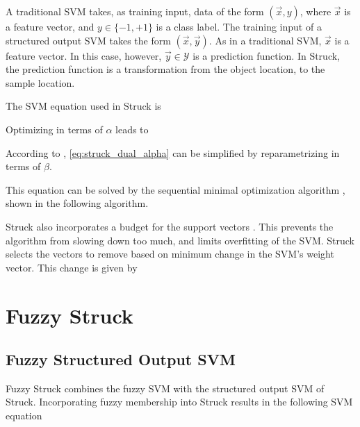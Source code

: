 \documentclass{IEEEtran}
\begin{document}
A traditional SVM takes, as training input, data of the form \((\vec{x}, y)\), where
\(\vec{x}\) is a feature vector, and \(y \in \{-1, +1\}\) is a class label. The training input of
a structured output SVM takes the form \((\vec{x}, \vec{y})\). As in a traditional SVM,
\(\vec{x}\) is a feature vector. In this case, however, \(\vec{y} \in \mathcal{Y}\) is a prediction
function. In Struck, the prediction function is a transformation from the object location, to the
sample location.

The SVM equation used in Struck is
\struckEquation

Optimizing in terms of \(\alpha\) leads to
\struckDualAlpha

According to \cite{Bordes:2007:SMS:1273496.1273508}, \eqref{eq:struck_dual_alpha} can be simplified
by reparametrizing in terms of \(\beta\).
\struckDualBeta

This equation can be solved by the sequential minimal optimization algorithm
\cite{sequential-minimal-optimization-a-fast-algorithm-for-training-support-vector-machines}, shown
in the following algorithm.

\struckSmo

Struck also incorporates a budget for the support vectors \cite{6126251}. This prevents the
algorithm from slowing down too much, and limits overfitting of the SVM. Struck selects the vectors
to remove based on minimum change in the SVM's weight vector. This change is given by
\struckWeightChange

%
%

\section{Fuzzy Struck} %
\subsection{Fuzzy Structured Output SVM} %
Fuzzy Struck combines the fuzzy SVM with the structured output SVM of Struck. Incorporating fuzzy
membership into Struck results in the following SVM equation
\fuzzyStruckEquation
\end{document}

